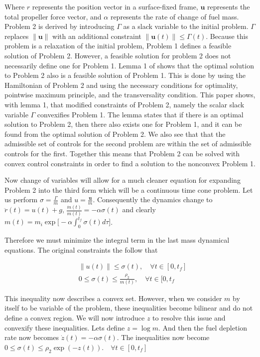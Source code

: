\documentclass[conf]{new-aiaa}
\begin{document}
\begin{doublespace}
Where $r$ represents the position vector in a surface-fixed frame, $\mathbf{u}$ represents the total propeller force vector, and $\alpha$ represents the rate of change of fuel mass. Problem 2 is derived by introducing $\Gamma$ as a slack variable to the initial problem. $\Gamma$ replaces $\|\mathbf{u}\|$ with an additional constraint $\|\mathbf{u}(t)\| \leq \Gamma(t)$. Because this problem is a relaxation of the initial problem, Problem 1 defines a feasible solution of Problem 2. However, a feasible solution for problem 2 does not necessarily define one for Problem 1. Lemma 1 of \citep{ploen2007} shows that the optimal solution to Problem 2 also is a feasible solution of Problem 1. This is done by using the Hamiltonian of Problem 2 and using the necessary conditions for optimality, pointwise maximum principle, and the transversality condition. This paper shows, with lemma 1, that modified constraints of Problem 2, namely the scalar slack variable $\Gamma$ convexifies Problem 1. The lemma states that if there is an optimal solution to Problem 2, then there also exists one for Problem 1, and it can be found from the optimal solution of Problem 2. We also see that that the admissible set of controls for the second problem are within the set of admissible controls for the first. Together this means that Problem 2 can be solved with convex control constraints in order to find a solution to the nonconvex Problem 1. 


Now change of variables will allow for a much cleaner equation for expanding Problem 2 into the third form which will be a continuous time cone problem. Let us perform $\sigma = \frac{\Gamma}{m}$ and $u = \frac{\mathbf{u}}{m}$. Consequently the dynamics change to $\ddot{r}(t) = u(t) + g$, $\frac{\dot{m}(t)}{m(t)} = -\alpha\sigma(t)$
and clearly $m(t)= m_i\exp\big[-\alpha \int^{t_f}_0 \sigma(t)d\tau \big]$.

Therefore we must minimize the integral term in the last mass dynamical equations. The original constraints the follow that
\begin{singlespace}
\begin{align*}
& \|u(t)\| \leq \sigma(t), \quad \forall t \in [0,t_f] \\
& 0 \leq \sigma(t) \leq \frac{\rho_2}{m(t)}, \quad \forall t \in [0,t_f 
\end{align*}
\end{singlespace}


This inequality now describes a convex set. However, when we consider $m$ by itself to be variable of the problem, these inequalities become bilinear and do not define a convex region. We will now introduce $z$ to resolve this issue and convexify these inequalities. Lets define $z = \log{m}$. And then the fuel depletion rate now becomes $\dot{z}(t) = -\alpha\sigma(t)$.
The inequalities now become $ 0\leq \sigma(t) \leq \rho_2\exp{(-z(t))}. \quad \forall t \in [0, t_f]$


\end{doublespace}
\end{document}
